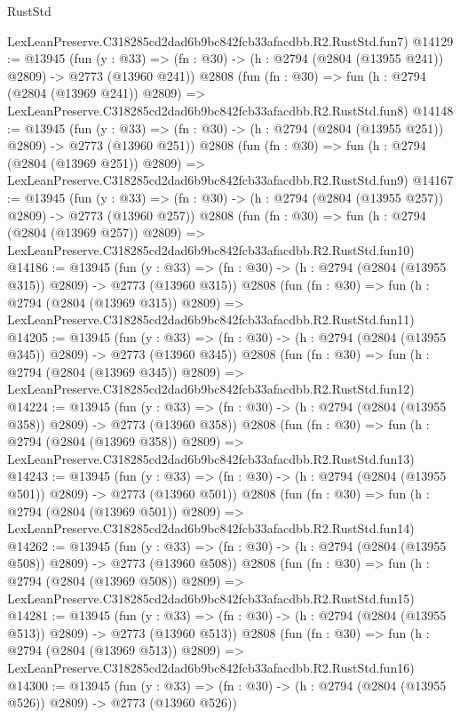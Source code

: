 \begin{lexlean}{RustStd}
\begin{coremodule}
    LexLeanPreserve.C318285cd2dad6b9bc842fcb33afacdbb.R2.RustStd.fun7)
@14129 := @13945
    (fun (y : @33) => (fn : @30) -> (h : @2794 (@2804 (@13955 @241)) @2809) -> @2773 (@13960 @241))
    @2808
    (fun (fn : @30) =>
    fun (h : @2794 (@2804 (@13969 @241)) @2809) =>
    LexLeanPreserve.C318285cd2dad6b9bc842fcb33afacdbb.R2.RustStd.fun8)
@14148 := @13945
    (fun (y : @33) => (fn : @30) -> (h : @2794 (@2804 (@13955 @251)) @2809) -> @2773 (@13960 @251))
    @2808
    (fun (fn : @30) =>
    fun (h : @2794 (@2804 (@13969 @251)) @2809) =>
    LexLeanPreserve.C318285cd2dad6b9bc842fcb33afacdbb.R2.RustStd.fun9)
@14167 := @13945
    (fun (y : @33) => (fn : @30) -> (h : @2794 (@2804 (@13955 @257)) @2809) -> @2773 (@13960 @257))
    @2808
    (fun (fn : @30) =>
    fun (h : @2794 (@2804 (@13969 @257)) @2809) =>
    LexLeanPreserve.C318285cd2dad6b9bc842fcb33afacdbb.R2.RustStd.fun10)
@14186 := @13945
    (fun (y : @33) => (fn : @30) -> (h : @2794 (@2804 (@13955 @315)) @2809) -> @2773 (@13960 @315))
    @2808
    (fun (fn : @30) =>
    fun (h : @2794 (@2804 (@13969 @315)) @2809) =>
    LexLeanPreserve.C318285cd2dad6b9bc842fcb33afacdbb.R2.RustStd.fun11)
@14205 := @13945
    (fun (y : @33) => (fn : @30) -> (h : @2794 (@2804 (@13955 @345)) @2809) -> @2773 (@13960 @345))
    @2808
    (fun (fn : @30) =>
    fun (h : @2794 (@2804 (@13969 @345)) @2809) =>
    LexLeanPreserve.C318285cd2dad6b9bc842fcb33afacdbb.R2.RustStd.fun12)
@14224 := @13945
    (fun (y : @33) => (fn : @30) -> (h : @2794 (@2804 (@13955 @358)) @2809) -> @2773 (@13960 @358))
    @2808
    (fun (fn : @30) =>
    fun (h : @2794 (@2804 (@13969 @358)) @2809) =>
    LexLeanPreserve.C318285cd2dad6b9bc842fcb33afacdbb.R2.RustStd.fun13)
@14243 := @13945
    (fun (y : @33) => (fn : @30) -> (h : @2794 (@2804 (@13955 @501)) @2809) -> @2773 (@13960 @501))
    @2808
    (fun (fn : @30) =>
    fun (h : @2794 (@2804 (@13969 @501)) @2809) =>
    LexLeanPreserve.C318285cd2dad6b9bc842fcb33afacdbb.R2.RustStd.fun14)
@14262 := @13945
    (fun (y : @33) => (fn : @30) -> (h : @2794 (@2804 (@13955 @508)) @2809) -> @2773 (@13960 @508))
    @2808
    (fun (fn : @30) =>
    fun (h : @2794 (@2804 (@13969 @508)) @2809) =>
    LexLeanPreserve.C318285cd2dad6b9bc842fcb33afacdbb.R2.RustStd.fun15)
@14281 := @13945
    (fun (y : @33) => (fn : @30) -> (h : @2794 (@2804 (@13955 @513)) @2809) -> @2773 (@13960 @513))
    @2808
    (fun (fn : @30) =>
    fun (h : @2794 (@2804 (@13969 @513)) @2809) =>
    LexLeanPreserve.C318285cd2dad6b9bc842fcb33afacdbb.R2.RustStd.fun16)
@14300 := @13945
    (fun (y : @33) => (fn : @30) -> (h : @2794 (@2804 (@13955 @526)) @2809) -> @2773 (@13960 @526))

\end{coremodule}
\end{lexlean}
